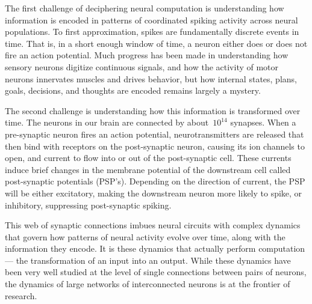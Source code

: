 The first challenge of deciphering neural computation is understanding
how information is encoded in patterns of coordinated spiking activity
across neural populations. To first approximation, spikes are
fundamentally discrete events in time.  That is, in a short enough
window of time, a neuron either does or does not fire an action
potential.  Much progress has been made in understanding how sensory
neurons digitize continuous signals, and how the activity of motor
neurons innervates muscles and drives behavior, but how internal
states, plans, goals, decisions, and thoughts are encoded remains
largely a mystery.


The second challenge is understanding how this information is
transformed over time. The neurons in our brain are connected by
about~$10^{14}$ synapses. When a pre-synaptic neuron fires an action
potential, neurotransmitters are released that then bind with
receptors on the post-synaptic neuron, causing its ion channels to
open, and current to flow into or out of the post-synaptic cell. These
currents induce brief changes in the membrane potential of the
downstream cell called post-synaptic potentials (PSP's). Depending on
the direction of current, the PSP will be either excitatory, making
the downstream neuron more likely to spike, or inhibitory, suppressing
post-synaptic spiking.


This web of synaptic connections imbues neural circuits with complex
dynamics that govern how patterns of neural activity evolve over time,
along with the information they encode. It is these dynamics that actually
perform computation --- the transformation of an input into an output.
While these dynamics have been very well studied at the level of
single connections between pairs of neurons, the dynamics of large
networks of interconnected neurons is at the frontier of research.

